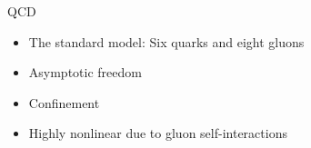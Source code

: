 \documentclass[10pt,show notes on second screen]{beamer}
\begin{document}
\begin{frame}{QCD}
\begin{itemize}
    \item <1->The standard model: Six quarks and eight gluons
    \item <2->Asymptotic freedom
    \item <3->Confinement
    \item <4->Highly nonlinear due to gluon self-interactions
\end{itemize}





\end{frame}
\end{document}
